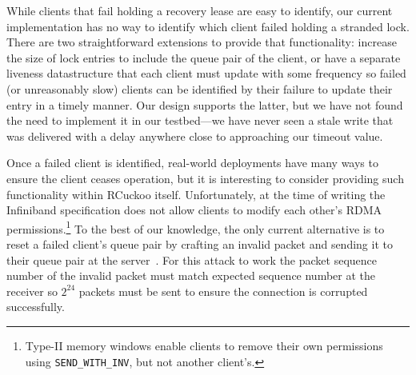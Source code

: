 

While clients that fail holding a recovery lease are easy to identify,
our current implementation has no way to identify which client failed
holding a stranded lock.  There are two straightforward extensions to
provide that functionality: increase the size of lock entries to
include the queue pair of the client, or have a separate liveness
datastructure that each client must update with some frequency so
failed (or unreasonably slow) clients can be identified by their
failure to update their entry in a timely manner.  Our design supports
the latter, but we have not found the need to implement it in our
testbed---we have never seen a stale write that was delivered with a
delay anywhere close to approaching our timeout value.

Once a failed client is identified, real-world deployments have
many ways to ensure the client ceases operation, but it is interesting to
consider providing such functionality within
RCuckoo itself.  Unfortunately, at the time of writing the Infiniband
specification does not allow clients to modify each other's RDMA
permissions.\footnote{Type-II memory windows enable clients to remove
their own permissions using \texttt{SEND\_WITH\_INV}, but not another client's.}
To the best of our knowledge, the only current alternative is to reset
a failed client's queue pair by crafting an invalid packet and
sending it to their queue pair at the server~\cite[Attack
  2]{redmark}. For this attack to work the packet sequence number of
the invalid packet must match expected sequence number at the receiver
so $2^{24}$ packets must be sent to ensure the connection is corrupted
successfully.
